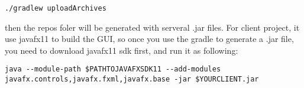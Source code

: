 \begin{lstlisting}
./gradlew uploadArchives
\end{lstlisting}

then the repos foler will be generated with serveral .jar files.
For client project, it use javafx11 to build the GUI, so once you use the gradle to generate a .jar file, you need to download javafx11 sdk first, and run it as following:

\begin{lstlisting}
java --module-path $PATHTOJAVAFXSDK11 --add-modules javafx.controls,javafx.fxml,javafx.base -jar $YOURCLIENT.jar
\end{lstlisting}

\clearpage